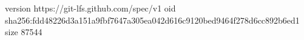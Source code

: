 version https://git-lfs.github.com/spec/v1
oid sha256:fdd48226d3a151a9fbf7647a305ea042d616c9120bed9464f278d6cc892b6ed1
size 87544
